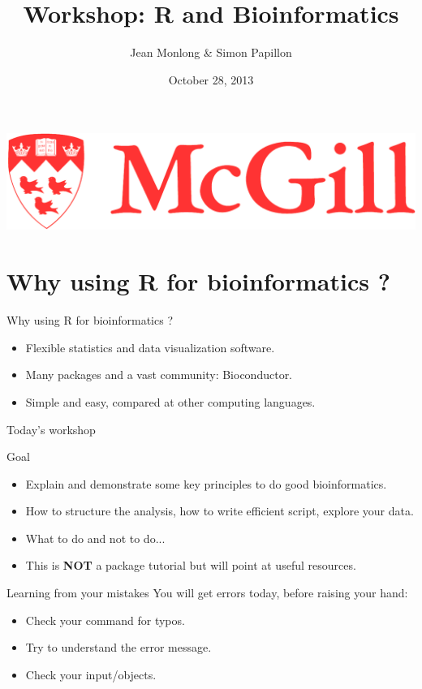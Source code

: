 \documentclass[10pt]{beamer}
\title{Workshop: R and Bioinformatics}
\author{Jean Monlong \& Simon Papillon}
\institute{Human Genetics department}
\date{October 28, 2013}
\begin{document}
\begin{frame}
  \titlepage
  \centering
  \includegraphics[page=1,height=.1\textheight]{imgs/McGill-Logo1.png}

\end{frame}

\section{Why using R for bioinformatics ?}

\begin{frame}[label=handout]{Why using R for bioinformatics ?}
  \begin{itemize}
  \item Flexible statistics and data visualization software.
  \item Many packages and a vast community: Bioconductor.
  \item Simple and easy, compared at other computing languages.
  \end{itemize}
\end{frame}


\begin{frame}[label=handout]{Today's workshop}
  \begin{block}{Goal}
    \begin{itemize}
    \item Explain and demonstrate some key principles to do good bioinformatics.
    \item How to structure the analysis, how to write efficient script, explore your data. 
    \item What to do and not to do...
      \bigskip
    \item This is {\bf NOT} a package tutorial but will point at useful resources.
    \end{itemize}    
  \end{block}
  \medskip

  \begin{block}{Learning from your mistakes}
    You will get errors today, before raising your hand:
    \begin{itemize}
    \item Check your command for typos.
    \item Try to understand the error message.
    \item Check your input/objects. 
    \end{itemize}    
  \end{block}
\end{frame}
\end{document}

